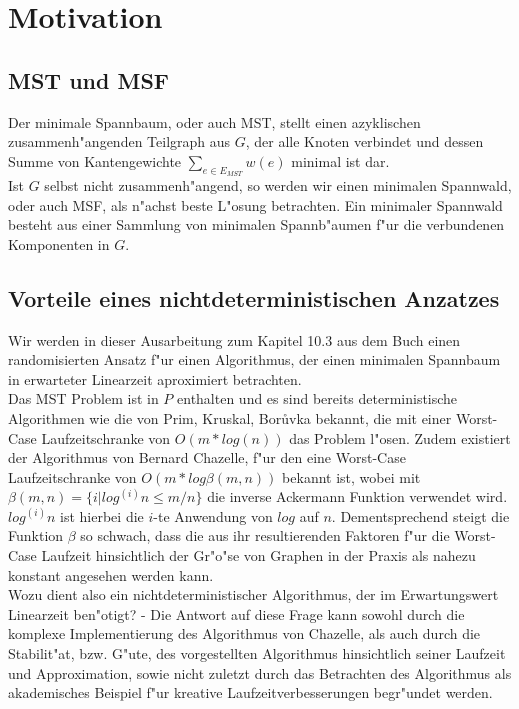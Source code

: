\section{Motivation}

\subsection{MST und MSF}
Der minimale Spannbaum, oder auch MST, stellt einen azyklischen 
    zusammenh"angenden Teilgraph aus $G$, der alle Knoten verbindet und
    dessen Summe von Kantengewichte $\sum_{e \in E_{MST}} w(e)$
    minimal ist dar.\\
Ist $G$ selbst nicht zusammenh"angend, so werden wir einen minimalen Spannwald,
    oder auch MSF,
    als n"achst beste L"osung betrachten.
    Ein minimaler Spannwald besteht aus einer Sammlung von minimalen 
    Spannb"aumen f"ur die verbundenen Komponenten in $G$.\\

\subsection{Vorteile eines nichtdeterministischen Anzatzes}

Wir werden in dieser Ausarbeitung zum Kapitel 10.3 aus dem Buch
    \cite{randAlg}
    einen
    randomisierten Ansatz f"ur einen Algorithmus, der einen minimalen Spannbaum
    in erwarteter Linearzeit aproximiert betrachten.\\
Das MST Problem ist in $P$ enthalten und es sind bereits 
    deterministische Algorithmen wie die von
    Prim, Kruskal, Bor\r uvka bekannt, 
    die mit einer Worst-Case Laufzeitschranke 
    von $O(m * log(n))$ das Problem l"osen.
    Zudem existiert der Algorithmus von Bernard Chazelle, f"ur den eine
    Worst-Case Laufzeitschranke von $O(m * log \beta(m,n))$ bekannt ist, wobei
    mit
    $\beta(m,n) = \{i | log^{(i)} n \leq m / n\}$ die inverse Ackermann Funktion
    verwendet wird. 
    $log^{(i)} n$ ist hierbei die $i$-te Anwendung von $log$ auf $n$.
    Dementsprechend steigt die Funktion $\beta$ so schwach, dass die
    aus ihr resultierenden Faktoren f"ur die Worst-Case Laufzeit hinsichtlich
    der Gr"o"se von Graphen in der Praxis als nahezu konstant angesehen werden 
    kann.\\
Wozu dient also ein nichtdeterministischer Algorithmus, der im Erwartungswert 
    Linearzeit ben"otigt?
    - Die Antwort auf diese Frage kann sowohl durch die komplexe Implementierung
    des Algorithmus von Chazelle, als auch durch die Stabilit"at, bzw. G"ute,
    des vorgestellten Algorithmus hinsichtlich seiner Laufzeit und Approximation,
    sowie nicht zuletzt durch das Betrachten des Algorithmus als akademisches
    Beispiel f"ur kreative Laufzeitverbesserungen begr"undet werden.\\
